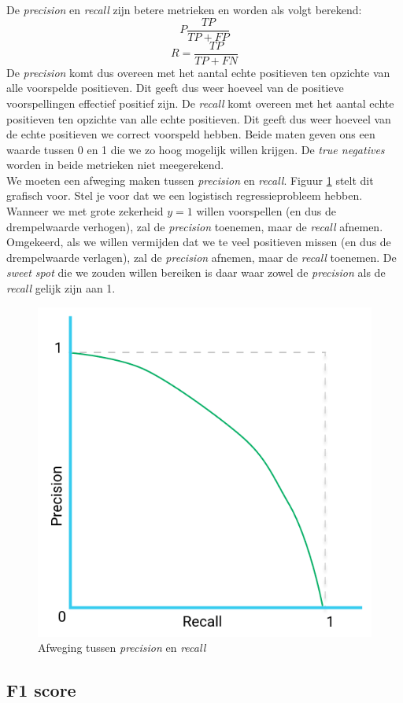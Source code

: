 De \textit{precision} en \textit{recall} zijn betere metrieken en worden als volgt berekend: 
\begin{equation}
	P  \frac{TP}{TP + FP}
\end{equation}
\begin{equation}
	R = \frac{TP}{TP + FN}
\end{equation}
\noindent
De \textit{precision} komt dus overeen met het aantal echte positieven ten opzichte van alle voorspelde positieven. Dit geeft dus weer hoeveel van de positieve voorspellingen effectief positief zijn. De \textit{recall} komt overeen met het aantal echte positieven ten opzichte van alle echte positieven. Dit geeft dus weer hoeveel van de echte positieven we correct voorspeld hebben. Beide maten geven ons een waarde tussen 0 en 1 die we zo hoog mogelijk willen krijgen. De \textit{true negatives} worden in beide metrieken niet meegerekend. \\
\newline
We moeten een afweging maken tussen \textit{precision} en \textit{recall}. Figuur \ref{fig:precision-recall} stelt dit grafisch voor. Stel je voor dat we een logistisch regressieprobleem hebben. Wanneer we met grote zekerheid $y=1$ willen voorspellen  (en dus de drempelwaarde verhogen), zal de \textit{precision} toenemen, maar de \textit{recall} afnemen. Omgekeerd, als we willen vermijden dat we te veel positieven missen (en dus de drempelwaarde verlagen), zal de \textit{precision} afnemen, maar de \textit{recall} toenemen. De \textit{sweet spot} die we zouden willen bereiken is daar waar zowel de \textit{precision} als de \textit{recall} gelijk zijn aan 1.

\begin{figure}[h]
	\centering
	\includegraphics[width=0.4\linewidth]{images/28-precision-recall.png}
	\caption{Afweging tussen \textit{precision} en \textit{recall}}
	\label{fig:precision-recall}
\end{figure}

\subsection{F1 score}

